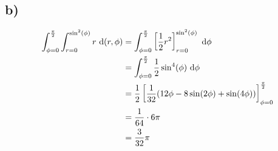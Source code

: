 \documentclass[main.tex]{subfiles}
\begin{document}
\subsection{b)}
\begin{align*}
    \int_{\phi = 0}^{\frac{\pi}{2}} \int_{r=0}^{\sin^2 (\phi)} r ~\mathrm{d}(r,\phi) 
        &= \int_{\phi = 0}^{\frac{\pi}{2}} \left[ \frac{1}{2} r^2 \right]_{r=0}^{\sin^2 (\phi)} ~\mathrm{d}\phi \\
        &= \int_{\phi = 0}^{\frac{\pi}{2}} \frac{1}{2} \sin^4 (\phi) ~\mathrm{d}\phi \\
        &= \frac{1}{2} \left[ \frac{1}{32} (12\phi - 8\sin (2\phi) + \sin(4\phi)) \right]_{\phi = 0}^{\frac{\pi}{2}} \\
        &= \frac{1}{64} \cdot 6 \pi\\
        &= \frac{3}{32} \pi
\end{align*}
\end{document}
